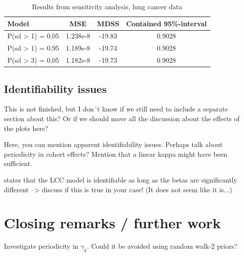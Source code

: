 \begin{table}
    \begin{center}
        \begin{tabular}{l |c c c }
        Model & MSE &   MDSS & Contained 95\%-interval\\
        \hline
        P(sd > 1) = 0.05 & 1.238e-8 & -19.83    & 0.9028 \\
        P(sd > 1) = 0.95 & 1.189e-8 & -19.74    & 0.9028 \\
        P(sd > 3) = 0.05 & 1.182e-8 & -19.73    & 0.9028 \\
        \end{tabular}
    \caption{Results from sensitivity analysis, lung cancer data}\label{tbl:mv-sensitivity-lung}
    \end{center}
\end{table}

\newpage 
\subsection{Identifiability issues}
\textcolor{myDarkBlue}{This is not finished, but I don´t know if we still need to include a separate section about this? Or if we should move all the discussion about the effects of the plots here? }
\textcolor{myDarkGreen}{
Here, you can mention apparent identifiability issues. Perhaps talk about periodicity in cohort effects? Mention that a linear kappa might have been sufficient. 

\parencite{Wisniowski2015} states that the LCC model is identifiable as long as the betas are significantly different --> discuss if this is true in your case! (It does not seem like it is...)
}

\newpage
\section{Closing remarks / further work}
\label{sec:closingRemarks}
Investigate periodicity in $\gamma_k$. Could it be avoided using random walk-2 priors? 